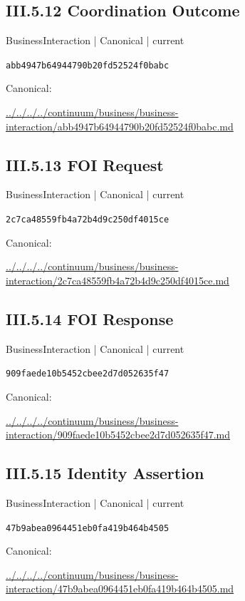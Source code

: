 \documentclass[10pt,a4paper]{article}
\begin{document}
\subsection*{III.5.12 Coordination Outcome}
\label{element-abb4947b64944790b20fd52524f0babc}
{\small BusinessInteraction | Canonical | current}\par
\texttt{abb4947b64944790b20fd52524f0babc}\par
Canonical: \par
{\footnotesize\url{../../../../continuum/business/business-interaction/abb4947b64944790b20fd52524f0babc.md}}\par
\subsection*{III.5.13 FOI Request}
\label{element-2c7ca48559fb4a72b4d9c250df4015ce}
{\small BusinessInteraction | Canonical | current}\par
\texttt{2c7ca48559fb4a72b4d9c250df4015ce}\par
Canonical: \par
{\footnotesize\url{../../../../continuum/business/business-interaction/2c7ca48559fb4a72b4d9c250df4015ce.md}}\par
\subsection*{III.5.14 FOI Response}
\label{element-909faede10b5452cbee2d7d052635f47}
{\small BusinessInteraction | Canonical | current}\par
\texttt{909faede10b5452cbee2d7d052635f47}\par
Canonical: \par
{\footnotesize\url{../../../../continuum/business/business-interaction/909faede10b5452cbee2d7d052635f47.md}}\par
\subsection*{III.5.15 Identity Assertion}
\label{element-47b9abea0964451eb0fa419b464b4505}
{\small BusinessInteraction | Canonical | current}\par
\texttt{47b9abea0964451eb0fa419b464b4505}\par
Canonical: \par
{\footnotesize\url{../../../../continuum/business/business-interaction/47b9abea0964451eb0fa419b464b4505.md}}\par
\end{document}
